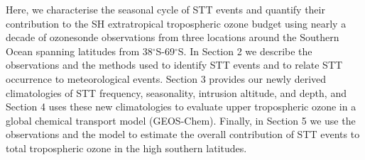 Here, we characterise the seasonal cycle of STT events and quantify their contribution to the SH extratropical tropospheric ozone budget using nearly a decade of ozonesonde observations from three locations around the Southern Ocean spanning latitudes from 38$^{\circ}$S-69$^{\circ}$S. 
In Section 2 we describe the observations and the methods used to identify STT events and to relate STT occurrence to meteorological events.
Section 3 provides our newly derived climatologies of STT frequency, seasonality, intrusion altitude, and depth, and Section 4 uses these new climatologies to evaluate upper tropospheric ozone in a global chemical transport model (GEOS-Chem). 
Finally, in Section 5 we use the observations and the model to estimate the overall contribution of STT events to total tropospheric ozone in the high southern latitudes.
